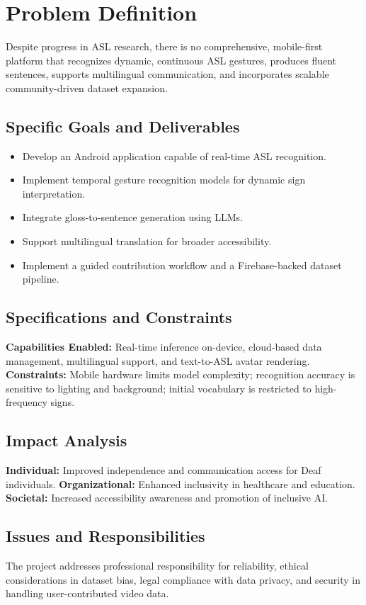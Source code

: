 \documentclass[conference]{IEEEtran}
\begin{document}
\section{Problem Definition}
Despite progress in ASL research, there is no comprehensive, mobile-first platform that recognizes dynamic, continuous ASL gestures, produces fluent sentences, supports multilingual communication, and incorporates scalable community-driven dataset expansion.

\subsection{Specific Goals and Deliverables}
\begin{itemize}
    \item Develop an Android application capable of real-time ASL recognition.
    \item Implement temporal gesture recognition models for dynamic sign interpretation.
    \item Integrate gloss-to-sentence generation using LLMs.
    \item Support multilingual translation for broader accessibility.
    \item Implement a guided contribution workflow and a Firebase-backed dataset pipeline.
\end{itemize}

\subsection{Specifications and Constraints}
\textbf{Capabilities Enabled:} Real-time inference on-device, cloud-based data management, multilingual support, and text-to-ASL avatar rendering.
\textbf{Constraints:} Mobile hardware limits model complexity; recognition accuracy is sensitive to lighting and background; initial vocabulary is restricted to high-frequency signs.

\subsection{Impact Analysis}
\textbf{Individual:} Improved independence and communication access for Deaf individuals.
\textbf{Organizational:} Enhanced inclusivity in healthcare and education.
\textbf{Societal:} Increased accessibility awareness and promotion of inclusive AI.

\subsection{Issues and Responsibilities}
The project addresses professional responsibility for reliability, ethical considerations in dataset bias, legal compliance with data privacy, and security in handling user-contributed video data.
\end{document}
